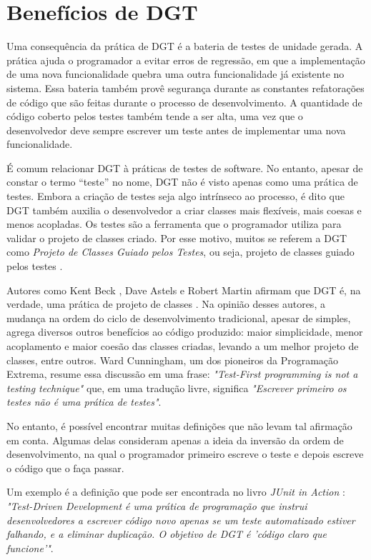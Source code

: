 \section{Benefícios de DGT}

Uma consequência da prática de DGT é a bateria de testes de unidade gerada.
A prática ajuda o programador a evitar erros de regressão, em que a implementação de
uma nova funcionalidade quebra uma outra funcionalidade já existente no sistema.
Essa bateria também provê segurança durante as
constantes refatorações de código que são feitas durante o processo de
desenvolvimento.
A quantidade de código coberto pelos testes também tende a ser alta, uma vez que o
desenvolvedor deve sempre escrever um teste antes de implementar uma nova
funcionalidade. 

É comum relacionar DGT à práticas de testes de software. No entanto, apesar de constar o
termo ``teste'' no nome, DGT não é visto apenas como uma prática de testes.
Embora a criação de testes seja algo intrínseco ao processo, é dito que DGT também 
auxilia o desenvolvedor a criar classes mais flexíveis, mais coesas e
menos acopladas. Os testes são a ferramenta que o programador utiliza para
validar o projeto de classes criado. Por esse motivo, muitos se referem a DGT como
\textit{Projeto de Classes Guiado pelos Testes}, ou seja, projeto de classes guiado pelos testes
\cite{tdd-taxonomy}.

Autores como Kent Beck \cite{aim-fire}, Dave Astels \cite{astels-tdd} e
Robert Martin \cite{bob-martin} afirmam que DGT é, na verdade, uma prática de
projeto de classes \cite{tdd-taxonomy} \cite{aim-fire}.
Na opinião desses autores, a mudança na ordem do ciclo de
desenvolvimento tradicional, apesar de simples, agrega diversos outros
benefícios ao código produzido: maior simplicidade, menor acoplamento e maior
coesão das classes criadas, levando a um melhor projeto de classes, entre
outros. Ward Cunningham, um dos pioneiros da Programação Extrema, resume essa 
discussão em uma frase: \textit{"Test-First programming is not a testing technique"} 
que, em uma tradução livre, significa \textit{"Escrever primeiro os testes
não é uma prática de testes"}.

No entanto, é possível encontrar muitas definições que
não levam tal afirmação em conta. Algumas delas consideram apenas a ideia da
inversão da ordem de desenvolvimento, na qual o programador primeiro
escreve o teste e depois escreve o código que o faça passar.

Um exemplo é a definição que pode ser encontrada no livro \textit{JUnit
in Action} \cite{junit-in-action}: \textit{"Test-Driven Development é uma
prática de programação que instrui desenvolvedores a escrever código novo
apenas se um teste automatizado estiver falhando, e a eliminar duplicação. O
objetivo de DGT é 'código claro que funcione'"}.

